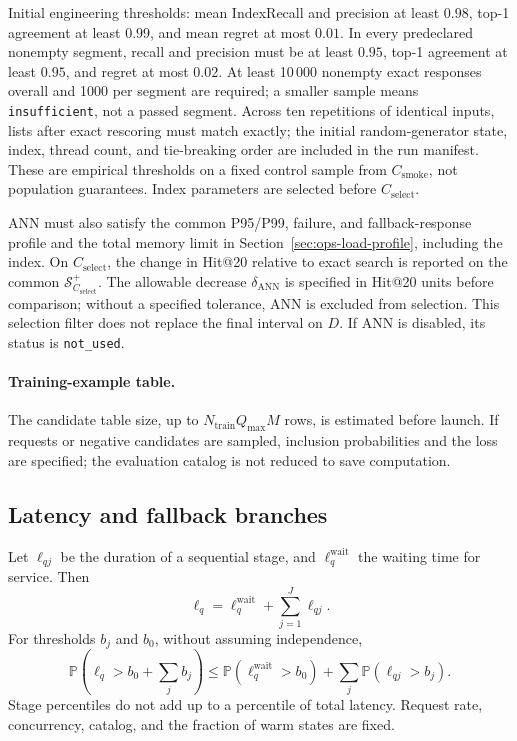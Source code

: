 \documentclass[12pt,a4paper]{article}
\newcommand{\code}[1]{{\ttfamily\small\nolinkurl{#1}}}
\newcommand{\Prob}{\mathbb P}
\theoremstyle{plainru}
\begin{document}
Initial engineering thresholds: mean IndexRecall and precision
at least $0.98$, top-1 agreement at least $0.99$, and mean regret
at most $0.01$. In every predeclared nonempty segment,
recall and precision must be at least $0.95$, top-1 agreement at least $0.95$,
and regret at most $0.02$. At least 10\,000 nonempty exact
responses overall and 1000 per segment are required; a smaller sample means
\code{insufficient}, not a passed segment. Across ten repetitions
of identical inputs, lists after exact rescoring must match exactly;
the initial random-generator state, index, thread count,
and tie-breaking order are included in the run manifest.
These are empirical thresholds on a fixed control sample from
$C_{\mathrm{smoke}}$, not population guarantees.
Index parameters are selected before $C_{\mathrm{select}}$.

ANN must also satisfy the common P95/P99, failure, and fallback-response profile
and the total memory limit in Section~\ref{sec:ops-load-profile}, including the index.
On $C_{\mathrm{select}}$, the change in Hit@20 relative to exact search
is reported on the common $\mathcal S_{C_{\mathrm{select}}}^+$.
The allowable decrease $\delta_{\mathrm{ANN}}$ is specified in Hit@20 units
before comparison; without a specified tolerance, ANN is excluded from selection.
This selection filter does not replace the final interval on $D$.
If ANN is disabled, its status is \code{not_used}.

\paragraph{Training-example table.}
The candidate table size, up to \(N_{\mathrm{train}}Q_{\max}M\) rows,
is estimated before launch. If requests or negative candidates are sampled,
inclusion probabilities and the loss are specified; the evaluation catalog
is not reduced to save computation.

\subsection{Latency and fallback branches}
\label{sec:ops-deadlines}

Let \(\ell_{qj}\) be the duration of a sequential stage,
and \(\ell_q^{\mathrm{wait}}\) the waiting time for service. Then
\begin{equation}\label{eq:ops-latency}
\ell_q=\ell_q^{\mathrm{wait}}+\sum_{j=1}^{J}\ell_{qj}.
\end{equation}
For thresholds \(b_j\) and \(b_0\), without assuming independence,
\begin{equation}\label{eq:ops-latency-bound}
\Prob\!\left(\ell_q>b_0+\sum_j b_j\right)
\le \Prob(\ell_q^{\mathrm{wait}}>b_0)+\sum_j\Prob(\ell_{qj}>b_j).
\end{equation}
Stage percentiles do not add up to a percentile of total latency.
Request rate, concurrency, catalog, and the fraction of warm states are fixed.
\end{document}
